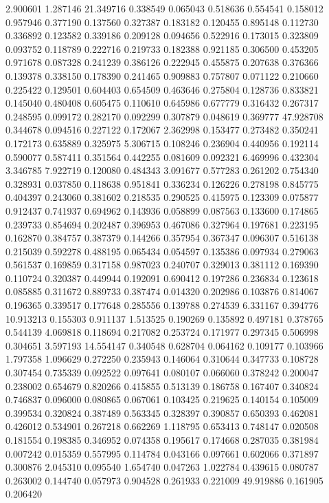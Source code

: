 2.900601
1.287146
21.349716
0.338549
0.065043
0.518636
0.554541
0.158012
0.957946
0.377190
0.137560
0.327387
0.183182
0.120455
0.895148
0.112730
0.336892
0.123582
0.339186
0.209128
0.094656
0.522916
0.173015
0.323809
0.093752
0.118789
0.222716
0.219733
0.182388
0.921185
0.306500
0.453205
0.971678
0.087328
0.241239
0.386126
0.222945
0.455875
0.207638
0.376366
0.139378
0.338150
0.178390
0.241465
0.909883
0.757807
0.071122
0.210660
0.225422
0.129501
0.604403
0.654509
0.463646
0.275804
0.128736
0.833821
0.145040
0.480408
0.605475
0.110610
0.645986
0.677779
0.316432
0.267317
0.248595
0.099172
0.282170
0.092299
0.307879
0.048619
0.369777
47.928708
0.344678
0.094516
0.227122
0.172067
2.362998
0.153477
0.273482
0.350241
0.172173
0.635889
0.325975
5.306715
0.108246
0.236904
0.440956
0.192114
0.590077
0.587411
0.351564
0.442255
0.081609
0.092321
6.469996
0.432304
3.346785
7.922719
0.120080
0.484343
3.091677
0.577283
0.261202
0.754340
0.328931
0.037850
0.118638
0.951841
0.336234
0.126226
0.278198
0.845775
0.404397
0.243060
0.381602
0.218535
0.290525
0.415975
0.123309
0.075877
0.912437
0.741937
0.694962
0.143936
0.058899
0.087563
0.133600
0.174865
0.239733
0.854694
0.202487
0.396953
0.467086
0.327964
0.197681
0.223195
0.162870
0.384757
0.387379
0.144266
0.357954
0.367347
0.096307
0.516138
0.215039
0.592278
0.488195
0.065434
0.054597
0.135386
0.097934
0.279063
0.561537
0.169859
0.317158
0.987023
0.240707
0.329013
0.381112
0.169390
0.110724
0.320387
0.449944
0.192091
0.690412
0.197286
0.236834
0.123618
0.085885
0.311672
0.889733
0.387474
0.014320
0.202986
0.103876
0.814067
0.196365
0.339517
0.177648
0.285556
0.139788
0.274539
6.331167
0.394776
10.913213
0.155303
0.911137
1.513525
0.190269
0.135892
0.497181
0.378765
0.544139
4.069818
0.118694
0.217082
0.253724
0.171977
0.297345
0.506998
0.304651
3.597193
14.554147
0.340548
0.628704
0.064162
0.109177
0.103966
1.797358
1.096629
0.272250
0.235943
0.146064
0.310644
0.347733
0.108728
0.307454
0.735339
0.092522
0.097641
0.080107
0.066060
0.378242
0.200047
0.238002
0.654679
0.820266
0.415855
0.513139
0.186758
0.167407
0.340824
0.746837
0.096000
0.080865
0.067061
0.103425
0.219625
0.140154
0.105009
0.399534
0.320824
0.387489
0.563345
0.328397
0.390857
0.650393
0.462081
0.426012
0.534901
0.267218
0.662269
1.118795
0.653413
0.748147
0.020508
0.181554
0.198385
0.346952
0.074358
0.195617
0.174668
0.287035
0.381984
0.007242
0.015359
0.557995
0.114784
0.043166
0.097661
0.602066
0.371897
0.300876
2.045310
0.095540
1.654740
0.047263
1.022784
0.439615
0.080787
0.263002
0.144740
0.057973
0.904528
0.261933
0.221009
49.919886
0.161905
0.206420
